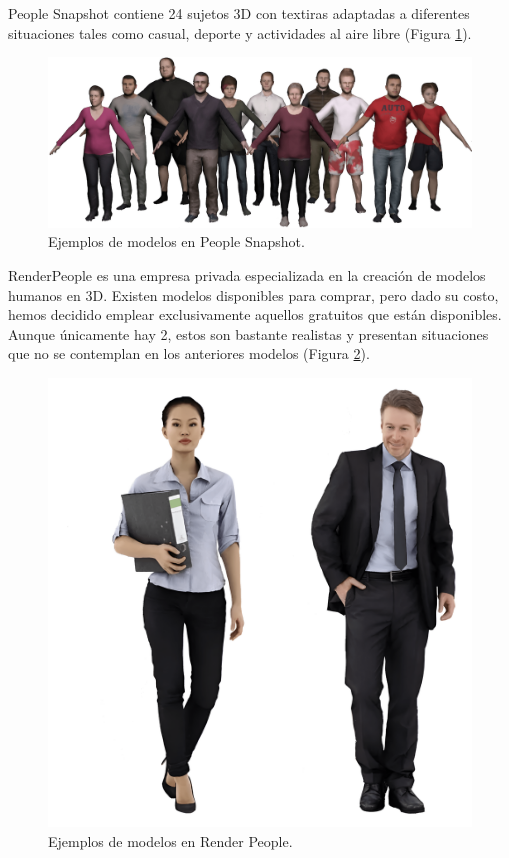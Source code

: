 People Snapshot \cite{63} contiene 24 sujetos 3D con textiras adaptadas a diferentes situaciones tales como casual, deporte y actividades al aire libre (Figura \ref{fig20}).

\begin{figure}[H]
	\centering
	\includegraphics[scale=0.5]{imagenes/cap4/snapshot.png}
	\caption[Ejemplos People Snapshot]{Ejemplos de modelos en People Snapshot.}
	\label{fig20}
\end{figure}

RenderPeople es una empresa privada especializada en la creación de modelos humanos en 3D. Existen modelos disponibles para comprar, pero dado su costo, hemos decidido emplear exclusivamente aquellos gratuitos que están disponibles. Aunque únicamente hay 2, estos son bastante realistas y presentan situaciones que no se contemplan en los anteriores modelos (Figura \ref{fig21}).

\begin{figure}[H]
	\centering
	\includegraphics[scale=0.04]{imagenes/cap4/renderpeople.png}
	\caption[Ejemplos Render People]{Ejemplos de modelos en Render People.}
	\label{fig21}
\end{figure}

